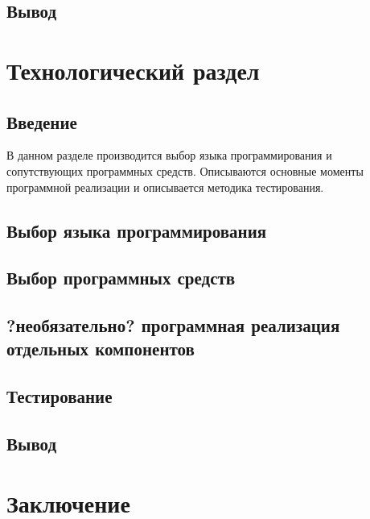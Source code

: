 \documentclass[a4paper,12pt]{report}
\numberwithin{equation}{section}
\begin{document}
\subsection{Вывод}

\clearpage
\section{Технологический раздел}
\subsection{Введение}
В данном разделе производится выбор языка программирования и сопутствующих программных средств. 
Описываются основные моменты программной реализации и описывается методика тестирования.

\subsection{Выбор языка программирования}

\subsection{Выбор программных средств}

\subsection{?необязательно? программная реализация отдельных компонентов}

\subsection{Тестирование}

\subsection{Вывод}

\clearpage
\section{Заключение}
\end{document}
